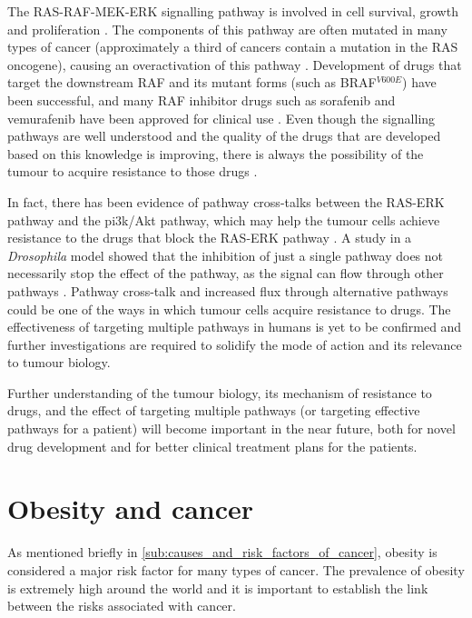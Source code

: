 The RAS-RAF-MEK-ERK signalling pathway is  involved in cell survival, growth and proliferation \citep{Samatar2014,Wilhelm2006}.
The components of this pathway are often mutated in many types of cancer (approximately a third of cancers contain a mutation in the RAS oncogene), causing an overactivation of this pathway \citep{Samatar2014}.
Development of drugs that target  the downstream RAF and its mutant forms (such as BRAF$^{V600E}$) have been successful, and many RAF inhibitor drugs such as sorafenib and vemurafenib have been approved for clinical use \citep{Samatar2014,Wilhelm2006}.
Even though the signalling pathways are well understood and the quality of the drugs that are developed based on this knowledge is improving, there is always the possibility of the tumour to acquire resistance to those drugs \citep{Samatar2014}.

In fact, there has been evidence of pathway cross-talks between the RAS-ERK pathway and the \gls{pi3k}/Akt pathway, which may help the tumour cells achieve resistance to the  drugs that block the RAS-ERK pathway \citep{Moelling2002,Zimmermann1999a}.
A study in a \textit{Drosophila} model showed that the inhibition of just a single pathway does not necessarily stop the effect of the pathway, as the signal can flow through other pathways \citep{Dar2012}.
Pathway cross-talk and increased flux through alternative pathways could be one of the ways in which tumour cells acquire resistance to drugs.
The effectiveness of targeting multiple pathways in humans is yet to be confirmed and further investigations are required to solidify the mode of action and its relevance to tumour biology.

Further understanding of the tumour biology, its mechanism of resistance to drugs, and the effect of targeting multiple pathways (or targeting effective pathways for a patient) will become important in the near future, both for novel drug development and for better clinical treatment plans for the patients.

\section{Obesity and cancer}
\label{sec:obesity_and_cancer}

As mentioned briefly in \cref{sub:causes_and_risk_factors_of_cancer}, obesity is considered a major risk factor for many types of cancer.
The prevalence of obesity is extremely high around the world and  it is important to establish the link between the risks associated with cancer.

